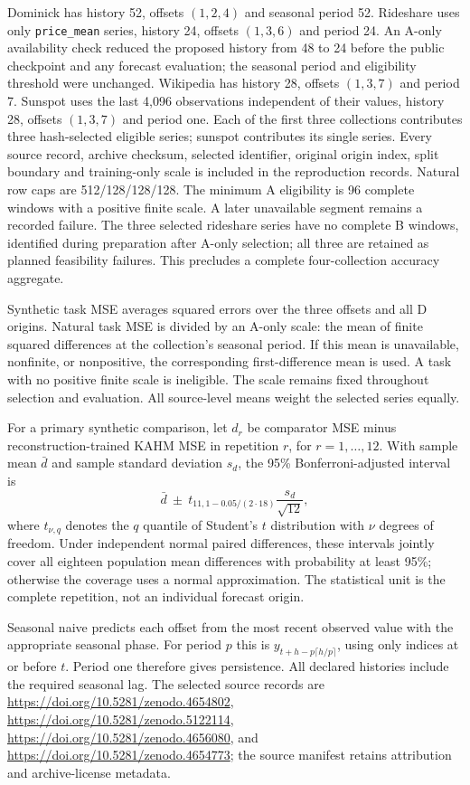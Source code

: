 Dominick has history 52, offsets $(1,2,4)$ and seasonal period 52.
Rideshare uses only \texttt{price\_mean} series, history 24, offsets
$(1,3,6)$ and period 24. An A-only availability check reduced the
proposed history from 48 to 24 before the public checkpoint and any
forecast evaluation; the seasonal period and eligibility threshold
were unchanged. Wikipedia has history 28, offsets $(1,3,7)$ and
period 7. Sunspot uses the last 4,096 observations independent of their
values, history 28, offsets $(1,3,7)$ and period one. Each of the first
three collections contributes three hash-selected eligible series;
sunspot contributes its single series. Every source record, archive
checksum, selected identifier, original origin index, split boundary and
training-only scale is included in the reproduction records. Natural row caps are 512/128/128/128.
The minimum A eligibility is 96 complete windows with a positive finite
scale. A later unavailable segment remains a recorded failure. The three selected
rideshare series have no complete B windows, identified during preparation
after A-only selection; all three are retained as planned feasibility
failures. This precludes a complete four-collection accuracy aggregate.

Synthetic task MSE averages squared errors over the three offsets and
all D origins. Natural task MSE is divided by an A-only scale: the mean
of finite squared differences at the collection's seasonal period. If
this mean is unavailable, nonfinite, or nonpositive, the corresponding
first-difference mean is used. A task with no positive finite scale is
ineligible. The scale remains fixed throughout selection and evaluation.
All source-level means weight the selected series equally.

For a primary synthetic comparison, let $d_r$ be comparator MSE minus
reconstruction-trained KAHM MSE in repetition $r$, for $r=1,\ldots,12$.
With sample mean $\bar d$ and sample standard deviation $s_d$, the
95\% Bonferroni-adjusted interval is
\[
 \bar d\ \pm\ t_{11,1-0.05/(2\cdot18)}\frac{s_d}{\sqrt{12}},
\]
where $t_{\nu,q}$ denotes the $q$ quantile of Student's $t$ distribution
with $\nu$ degrees of freedom. Under independent normal paired
differences, these intervals jointly cover all eighteen population mean
differences with probability at least 95\%; otherwise the coverage
uses a normal approximation. The statistical unit is the complete
repetition, not an individual forecast origin.

Seasonal naive predicts each offset from the most recent observed value
with the appropriate seasonal phase. For period $p$ this is
$y_{t+h-p\lceil h/p\rceil}$, using only indices at or before $t$.
Period one therefore gives persistence. All declared histories include
the required seasonal lag. The selected source records are
\url{https://doi.org/10.5281/zenodo.4654802},
\url{https://doi.org/10.5281/zenodo.5122114},
\url{https://doi.org/10.5281/zenodo.4656080}, and
\url{https://doi.org/10.5281/zenodo.4654773}; the source manifest retains
attribution and archive-license metadata.

